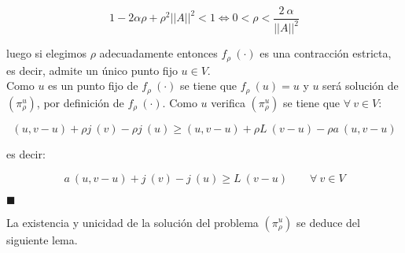 \begin{demosteorema}
\begin{itemize}
\begin{displaymath}
1-2\alpha \rho+\rho^2 ||A||^2 < 1 \Longleftrightarrow 0 < \rho <
\frac{2\ \alpha}{||A||^2}
\end{displaymath}

luego si elegimos $\rho$ adecuadamente entonces $f_{\rho}\ (\cdot )$ es una
contracci\'on estricta, es decir, admite un \'unico punto fijo $u \in V$.\\

Como $u$ es un punto fijo de $f_{\rho}\ (\cdot )$ se tiene que
$f_{\rho}\ (u) = u$ y $u$ ser\'a soluci\'on de $(\pi^u_{\rho})$, por
definici\'on de $f_{\rho}\ (\cdot )$. Como $u$ verifica $(\pi^u_{\rho})$ se
tiene que $\forall \ v \in V$:

\begin{displaymath}
(u,v-u)+\rho j\ (v)-\rho j\ (u) \ge (u,v-u)+\rho L\ (v-u)-\rho a\ (u,v-u)
\end{displaymath}

es decir:

\begin{displaymath}
a\ (u,v-u)+j\ (v)-j\ (u) \ge L\ (v-u) \qquad \forall \ v \in V
\end{displaymath}

\end{itemize}

\begin{flushright}
$\blacksquare$
\end{flushright}

\end{demosteorema}

La existencia y unicidad de la soluci\'on del problema $(\pi^u_{\rho})$ se
deduce del siguiente lema.

